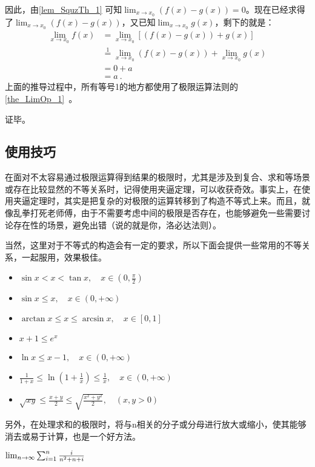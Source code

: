 因此，由\autoref{lem_SquzTh_1} 可知$\lim _{x\to x_0}(f(x)-g(x))=0$。现在已经求得了$\lim _{x\to x_0}(f(x)-g(x))$，又已知$\lim _{x\to x_0}g(x)$，剩下的就是：
$$
\begin{align*}
\lim _{x\to x_0}f(x) &= \lim _{x\to x_0}[(f(x)-g(x))+g(x)] \\ 
&\overset{\mathrm{1}}{=} \lim _{x\to x_0}(f(x)-g(x))+\lim _{x\to x_0}g(x)\\ 
&= 0+a\\ 
&=a~.\end{align*}
$$
上面的推导过程中，所有等号1的地方都使用了极限运算法则的\autoref{the_LimOp_1}~。

证毕。

\subsection{使用技巧}

在面对不太容易通过极限运算得到结果的极限时，尤其是涉及到复合、求和等场景或存在比较显然的不等关系时，记得使用夹逼定理，可以收获奇效。事实上，在使用夹逼定理时，其实是把复杂的对极限的运算转移到了构造不等式上来。而且，就像乱拳打死老师傅，由于不需要考虑中间的极限是否存在，也能够避免一些需要讨论存在性的场景，避免出错（说的就是你，洛必达法则）。

当然，这里对于不等式的构造会有一定的要求，所以下面会提供一些常用的不等关系，一起服用，效果极佳。

\begin{itemize}
\item $\sin x < x < \tan x, \quad x \in \left(0, \frac{\pi}{2}\right)$
\item $\sin x \leq x, \quad x \in (0, +\infty)$
\item $\arctan x \leq x \leq \arcsin x, \quad x \in [0, 1] $
\item $x + 1\leq e^x$
\item $\ln x\leq x - 1 , \quad x \in (0, +\infty)$
\item $\frac{1}{1 + x} \leq \ln\left(1 + \frac{1}{x}\right) \leq \frac{1}{x}, \quad x \in (0, +\infty)$
\item $\sqrt{xy} \leq \frac{x + y}{2} \leq \sqrt{\frac{x^2 + y^2}{2}}, \quad (x, y > 0)$
\end{itemize}

\begin{example}{}

\end{example}
另外，在处理求和的极限时，将与n相关的分子或分母进行放大或缩小，使其能够消去或易于计算，也是一个好方法。
\begin{example}{$\lim_{n\to \infty}\sum_{i=1}^n{i\over n^2+n+i}$}
\end{example}